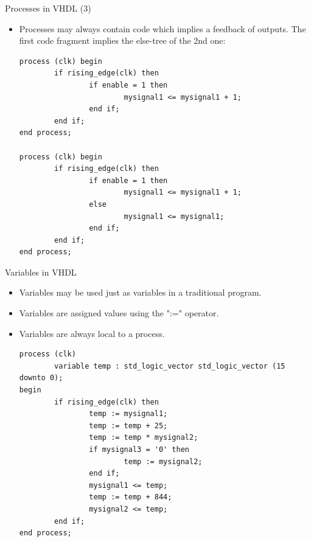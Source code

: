 \documentclass[pdf]{prosper}
\begin{document}
\begin{slide}{Processes in VHDL (3)}
\begin{itemize}
\item Processes may always contain code which implies a feedback of outputs. The first code fragment implies the else-tree of the 2nd one:

\begin{verbatim}
process (clk) begin
        if rising_edge(clk) then
                if enable = 1 then
                        mysignal1 <= mysignal1 + 1;
                end if;
        end if;
end process;

process (clk) begin
        if rising_edge(clk) then
                if enable = 1 then
                        mysignal1 <= mysignal1 + 1;
                else
                        mysignal1 <= mysignal1;
                end if;
        end if;
end process;
\end{verbatim}

\end{itemize}
\end{slide}

\begin{slide}{Variables in VHDL}
\begin{itemize}
\item Variables may be used just as variables in a traditional program.
\item Variables are assigned values using the ":=" operator.
\item Variables are always local to a process.

\begin{verbatim}
process (clk)
        variable temp : std_logic_vector std_logic_vector (15 downto 0);
begin
        if rising_edge(clk) then
                temp := mysignal1;
                temp := temp + 25;
                temp := temp * mysignal2;
                if mysignal3 = '0' then
                        temp := mysignal2;
                end if;
                mysignal1 <= temp;
                temp := temp + 844;
                mysignal2 <= temp;
        end if;
end process;
\end{verbatim}

\end{itemize}
\end{slide}
\end{document}
